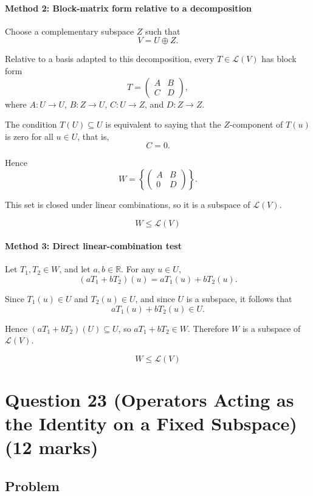 \documentclass[12pt]{article}
\begin{document}
\paragraph{Method 2: Block-matrix form relative to a decomposition}

Choose a complementary subspace \(Z\) such that
\[
V=U\oplus Z.
\]

Relative to a basis adapted to this decomposition, every \(T\in\mathcal L(V)\) has block form
\[
T=
\begin{pmatrix}
A & B\\
C & D
\end{pmatrix},
\]
where \(A:U\to U\), \(B:Z\to U\), \(C:U\to Z\), and \(D:Z\to Z\).

The condition \(T(U)\subseteq U\) is equivalent to saying that the \(Z\)-component of \(T(u)\) is zero for all \(u\in U\), that is,
\[
C=0.
\]

Hence
\[
W=
\left\{
\begin{pmatrix}
A & B\\
0 & D
\end{pmatrix}
\right\}.
\]

This set is closed under linear combinations, so it is a subspace of \(\mathcal L(V)\).

\[
\boxed{W\le \mathcal L(V)}
\]

\paragraph{Method 3: Direct linear-combination test}

Let \(T_1,T_2\in W\), and let \(a,b\in\mathbb R\). For any \(u\in U\),
\[
(aT_1+bT_2)(u)=aT_1(u)+bT_2(u).
\]

Since \(T_1(u)\in U\) and \(T_2(u)\in U\), and since \(U\) is a subspace, it follows that
\[
aT_1(u)+bT_2(u)\in U.
\]

Hence \((aT_1+bT_2)(U)\subseteq U\), so \(aT_1+bT_2\in W\). Therefore \(W\) is a subspace of \(\mathcal L(V)\).

\[
\boxed{W\le \mathcal L(V)}
\]

\newpage
\section{Question 23 (Operators Acting as the Identity on a Fixed Subspace) \hfill (12 marks)}
\subsection{Problem}
\end{document}
